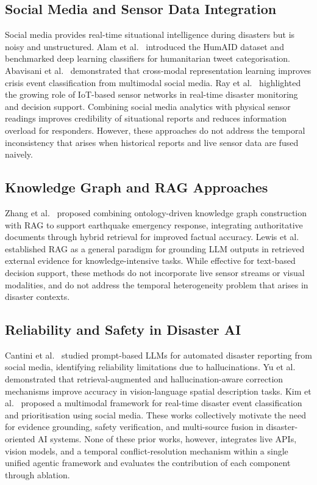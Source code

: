 \documentclass[conference]{IEEEtran}
\begin{document}
\subsection{Social Media and Sensor Data Integration}

Social media provides real-time situational intelligence during disasters but
is noisy and unstructured. Alam et al.~\cite{b18} introduced the HumAID dataset
and benchmarked deep learning classifiers for humanitarian tweet categorisation.
Abavisani et al.~\cite{b19} demonstrated that cross-modal representation learning
improves crisis event classification from multimodal social media. Ray
et al.~\cite{b20} highlighted the growing role of IoT-based sensor networks in
real-time disaster monitoring and decision support. Combining social media
analytics with physical sensor readings improves credibility of situational
reports and reduces information overload for responders. However, these
approaches do not address the temporal inconsistency that arises when historical
reports and live sensor data are fused naively.

\subsection{Knowledge Graph and RAG Approaches}

Zhang et al.~\cite{b13} proposed combining ontology-driven knowledge graph
construction with RAG to support earthquake emergency response, integrating
authoritative documents through hybrid retrieval for improved factual accuracy.
Lewis et al.~\cite{b6} established RAG as a general paradigm for grounding LLM
outputs in retrieved external evidence for knowledge-intensive tasks. While
effective for text-based decision support, these methods do not incorporate live
sensor streams or visual modalities, and do not address the temporal
heterogeneity problem that arises in disaster contexts.

\subsection{Reliability and Safety in Disaster AI}

Cantini et al.~\cite{b10} studied prompt-based LLMs for automated disaster
reporting from social media, identifying reliability limitations due to
hallucinations. Yu et al.~\cite{b14} demonstrated that retrieval-augmented and
hallucination-aware correction mechanisms improve accuracy in vision-language
spatial description tasks. Kim et al.~\cite{b12} proposed a multimodal
framework for real-time disaster event classification and prioritisation using
social media. These works collectively motivate the need for evidence grounding,
safety verification, and multi-source fusion in disaster-oriented AI systems.
None of these prior works, however, integrates live APIs, vision models, and a
temporal conflict-resolution mechanism within a single unified agentic framework
and evaluates the contribution of each component through ablation.
\end{document}
